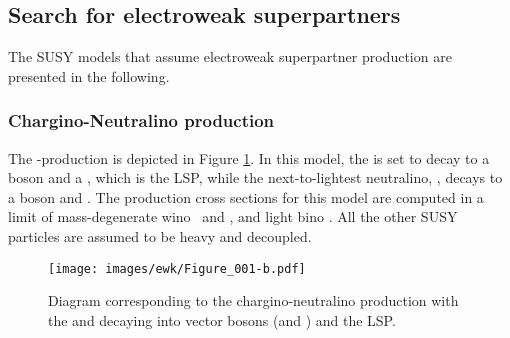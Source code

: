\subsection*{Search for electroweak superpartners}\label{sec:searchEWK}
\noindent\justify
The SUSY models that assume electroweak superpartner production are presented in the following. 
\subsubsection*{Chargino-Neutralino production}
\noindent\justify
The \firstcharg-\secondchi production is depicted in Figure \ref{sig:feynmanChargino}. 
In this model, the \firstcharg is set to decay to a \PW boson and a \firstchi, which is the LSP, while the next-to-lightest neutralino, \secondchi, decays to a \PZ boson and \firstchi.
The production cross sections for this model are computed in a limit of mass-degenerate wino \firstcharg\ and \secondchi, and light bino \firstchi.  
All the other SUSY particles are assumed to be heavy and decoupled.
\begin{figure}[!htp]
\centering
\texttt{[image: images/ewk/Figure\_001-b.pdf]}\\
\caption{Diagram corresponding to the chargino-neutralino production with the \firstcharg and \secondchi decaying into vector bosons (\PW and \PZ) and the LSP.} 
\label{sig:feynmanChargino}
\end{figure}                                                                                                                                                                    
